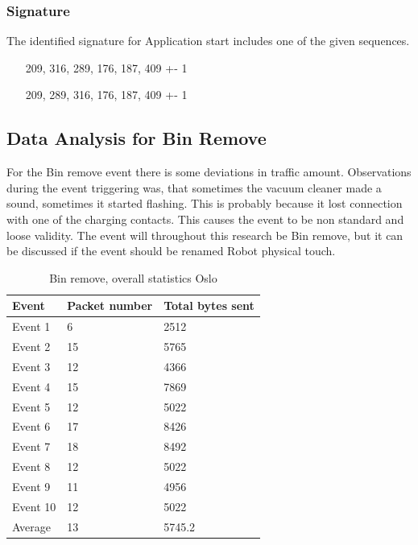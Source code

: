 \subsubsection{Signature}
The identified signature for Application start includes one of the given sequences.
\begin{itemize}
    \item [209, 316, 289, 176, 187, 409] +- 1
    \item [209, 289, 316, 176, 187, 409] +- 1
\end{itemize}


\subsection{Data Analysis for Bin Remove}
For the Bin remove event there is some deviations in traffic amount. Observations during the event triggering was, that sometimes the vacuum cleaner made a sound, sometimes it started flashing. This is probably because it lost connection with one of the charging contacts. This causes the event to be non standard and loose validity. The event will throughout this research be Bin remove, but it can be discussed if the event should be renamed Robot physical touch. 

\begin{table}[H]
\centering
\caption{Bin remove, overall statistics Oslo}
\label{tab:BRoverallOslo}
\begin{tabular}{|l|l|l|}
\hline
\textbf{Event} & \textbf{Packet number} & \textbf{Total bytes sent} \\ \hline
Event 1        & 6                      & 2512                      \\ \hline
Event 2        & 15                     & 5765                      \\ \hline
Event 3        & 12                     & 4366                      \\ \hline
Event 4        & 15                     & 7869                      \\ \hline
Event 5        & 12                     & 5022                      \\ \hline
Event 6        & 17                     & 8426                      \\ \hline
Event 7        & 18                     & 8492                      \\ \hline
Event 8        & 12                     & 5022                      \\ \hline
Event 9        & 11                     & 4956                      \\ \hline
Event 10       & 12                     & 5022                      \\ \hline
Average        & 13                     & 5745.2                    \\ \hline
\end{tabular}
\end{table}


